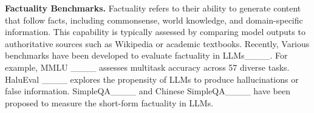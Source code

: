 


\noindent\textbf{Factuality Benchmarks.}
Factuality refers to their ability to generate content that follow facts, including commonsense, world knowledge, and domain-specific information. This capability is typically assessed by comparing model outputs to authoritative sources such as Wikipedia or academic textbooks.
Recently,
Various benchmarks have been developed to evaluate factuality in LLMs____.
For example,
MMLU ____ assesses multitask accuracy across 57 diverse tasks.
HaluEval ____ explores the propensity of LLMs to produce hallucinations or false information.
 SimpleQA____ and Chinese SimpleQA____ have been proposed to measure the short-form factuality in LLMs.

